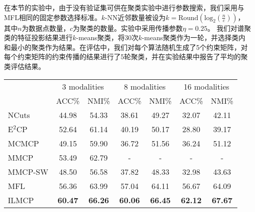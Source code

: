 在本节的实验中，由于没有验证集可供在聚类实验中进行参数搜索，我们采用与MFL相同的固定参数选择标准。$k$-NN近邻数量被设为$ k = \mathrm{Round}(\mathrm{log}_2(\frac{n}{c}))$，其中$ n $为数据点数量，$ c $为聚类的数量。实验中采用传播参数$\eta = 0.25$。
我们对谱聚类的特征投影结果进行$k$-means聚类，将30次$k$-means聚类作为一轮，并选择类内和最小的聚类作为结果。在评估中，我们对每个算法随机生成了5个约束矩阵，对每个约束矩阵的约束传播的结果进行了5轮聚类，并在实验结果中报告了平均的聚类评估结果。



\begin{table}[t]
    \label{tab4:modal}
    \centering
    \setlength{\tabcolsep}{8pt}
    \begin{tabular}{l*{6}{c}}
        \toprule
        &\multicolumn{2}{c}{3 modalities} & \multicolumn{2}{c}{8 modalities} & \multicolumn{2}{c}{16 modalities}\\
        \cmidrule(lr){2-3}
        \cmidrule(lr){4-5}
        \cmidrule(lr){6-7}
        & ACC\% & NMI\% & ACC\% & NMI\% & ACC\% & NMI\% \\
        \midrule
        NCuts & 44.98 & 54.33 & 38.61 & 49.27 & 32.07 & 42.11 \\ 
        E$^2$CP & 52.64 & 61.14 & 40.19 & 50.17 & 28.80 & 39.17 \\ 
        MCMCP & 49.15 & 59.90 & 36.72 & 51.56 & 36.24 & 51.12 \\ 
        MMCP & 53.49 & 62.79 & - & - & - & - \\ 
        MMCP-SW & 48.50 & 56.58 & 37.82 & 48.33 & 32.98 & 43.63 \\ 
        MFL & {56.36} & {63.99} & {57.04} & {64.11} & {56.67} &{ 64.09}\\
        ILMCP & \textbf{60.47} & \textbf{66.26} & \textbf{60.06} & \textbf{66.45 } & \textbf{62.12} &\textbf{ 67.67} \\
        \bottomrule
    \end{tabular}
\end{table}


